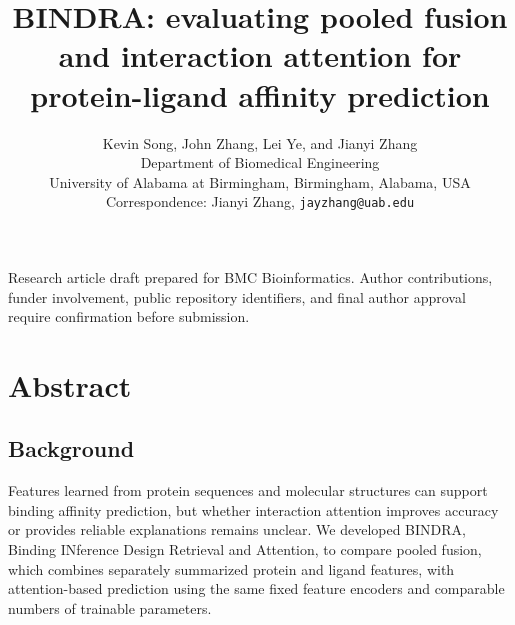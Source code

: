 \documentclass[12pt,a4paper]{article}
\begin{document}
\title{BINDRA: evaluating pooled fusion and interaction attention for protein-ligand affinity prediction}
\author{\normalsize Kevin Song, John Zhang, Lei Ye, and Jianyi Zhang\\[4pt]\small Department of Biomedical Engineering\\\small University of Alabama at Birmingham, Birmingham, Alabama, USA\\\small Correspondence: Jianyi Zhang, \texttt{jayzhang@uab.edu}}
\date{}
\begin{singlespace}\maketitle\end{singlespace}
\linenumbers
Research article draft prepared for BMC Bioinformatics. Author contributions, funder involvement, public repository identifiers, and final author approval require confirmation before submission.

\section*{Abstract}
\subsection*{Background}
Features learned from protein sequences and molecular structures can support binding affinity prediction, but whether interaction attention improves accuracy or provides reliable explanations remains unclear. We developed BINDRA, Binding INference Design Retrieval and Attention, to compare pooled fusion, which combines separately summarized protein and ligand features, with attention-based prediction using the same fixed feature encoders and comparable numbers of trainable parameters.
\end{document}
